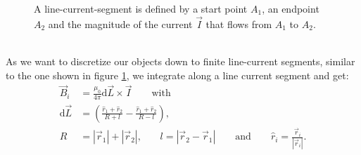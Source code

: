     \begin{figure}[h]
      \centering {}
      \caption{A line-current-segment is defined by a start point $A_1$, an endpoint $A_2$ and the magnitude of the current $\vec{I}$ that flows from $A_1$ to $A_2$.}
      \label{fig:definition line current segment}
    \end{figure}\\
    As we want to discretize our objects down to finite line-current segments, similar to the one shown in figure \ref{fig:definition line current segment}, we integrate along a line current segment and get:
    \begin{equation}
      \begin{aligned}
      \vec{B}_{i} &= \frac{\mu_0}{4\pi} \mathrm{d}\vec{L} \times \vec{I} \qquad \text{with} \\
      \mathrm{d}\vec{L} &= \left(\frac{\hat{r}_{1}+\hat{r}_{2}}{R+l}-\frac{\hat{r}_{1}+\hat{r}_{2}}{R-l}\right)\text{,} \\
      R&=|\vec{r}_{1}|+|\vec{r}_{2}| \text{,}\qquad l=|\vec{r}_{2}-\vec{r}_{1}|\qquad\text{and}\qquad \hat{r}_i = \frac{\vec{r}_i}{|\vec{r}_i|}\text{.}
      \end{aligned}
    \end{equation}
